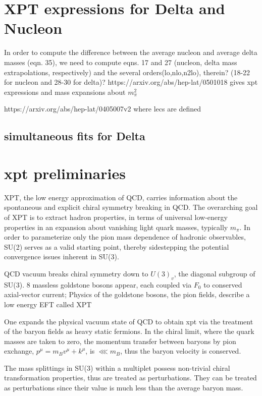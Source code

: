 \documentclass[12pt,tightenlines, raggedbottom, prd, notitlepage]{revtex4-1}
\begin{document}
\section*{XPT expressions for Delta and Nucleon}
In order to compute the difference between the average nucleon and average delta masses (eqn. 35), we need to compute eqns. 17 and 27
(nucleon, delta mass extrapolations, respectively) and the several orders(lo,nlo,n2lo), therein? (18-22 for nucleon and 28-30 for delta)?
https://arxiv.org/abs/hep-lat/0501018 gives xpt expressions and mass expansions about $m_\pi^2$

https://arxiv.org/abs/hep-lat/0405007v2 where lecs are defined






\subsection*{simultaneous fits for Delta}




\section*{xpt preliminaries}

XPT, the low energy approximation of QCD, carries information about the spontaneous and explicit chiral symmetry breaking in QCD. 
The overarching goal of XPT is to extract hadron properties, in terms of universal low-energy properties in an expansion about vanishing light
quark masses, typically $m_\pi$. In order to parameterize only the pion mass dependence of hadronic observables, SU(2) serves as a valid starting point,
thereby sidestepping the potential convergence issues inherent in SU(3). 

QCD vacuum breaks chiral symmetry down to $U(3)_v$, the diagonal subgroup of SU(3).
8 massless goldstone bosons appear, each coupled via $F_0$ to conserved axial-vector current; 
Physics of the goldstone bosons, the pion fields, describe a low energy EFT called XPT 
  
One expands the physical vacuum state of QCD to obtain xpt via the treatment of the baryon fields as heavy static fermions.
In the chiral limit, where the quark masses are taken to zero, the momentum transfer between baryons by pion exchange, $p^\mu = m_Bv^\mu + k^\mu$,
is $\lll m_B$, thus the baryon velocity is conserved.

The mass splittings in SU(3) within a multiplet possess non-trivial chiral transformation properties, thus are treated as perturbations.
They can be treated as perturbations since their value is much less than the average baryon mass.
\end{document}
